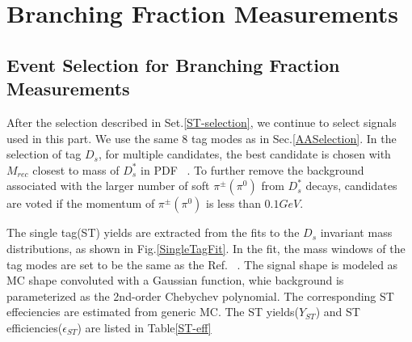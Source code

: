 \section{Branching Fraction Measurements}

\subsection{Event Selection for Branching Fraction Measurements}
\label{BFSelection}
After the selection described in Set.\ref{ST-selection}, we continue to select signals used in this part. 
We use the same 8 tag modes as in Sec.\ref{AASelection}.
In the selection of tag $D_{s}$, for multiple candidates, the best candidate is chosen with $M_{rec}$ closest to mass of $D_{s}^{*}$ in PDF ~\cite{PDG2018}.
To further remove the background associated with the larger number of soft $\pi^{\pm}(\pi^{0})$ from $D_{s}^{*}$ decays, candidates are voted if the momentum of $\pi^{\pm}(\pi^{0})$ is less than $0.1GeV$.

The single tag(ST) yields are extracted from the fits to the $D_{s}$ invariant mass distributions, as shown in Fig.\ref{SingleTagFit}. In the fit, the mass windows of the tag modes are set to be the same as the Ref. ~\cite{Doc-DB-630-v35}.
The signal shape is modeled as MC shape convoluted with a Gaussian function, whie background is parameterized as the 2nd-order Chebychev polynomial.
The corresponding ST effeciencies are estimated from generic MC. The ST yields($Y_{ST}$) and ST efficiencies($\epsilon_{ST}$) are listed in Table\ref{ST-eff}

